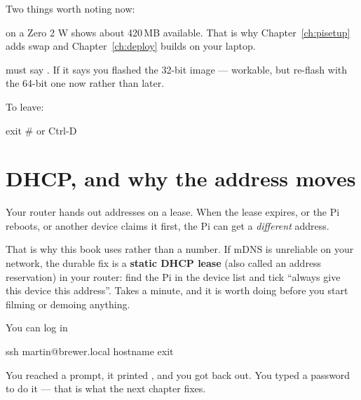 Two things worth noting now:

 on a Zero 2 W shows about 420\,MB available. That is why
Chapter~\ref{ch:pisetup} adds swap and Chapter~\ref{ch:deploy} builds on your
laptop.

 must say . If it says  you flashed the
32-bit image --- workable, but re-flash with the 64-bit one now rather than
later.

To leave:

\begin{shell}
exit          # or Ctrl-D
\end{shell}

\section{DHCP, and why the address moves}

Your router hands out addresses on a lease. When the lease expires, or the Pi
reboots, or another device claims it first, the Pi can get a \emph{different}
address.

That is why this book uses  rather than a number. If mDNS is
unreliable on your network, the durable fix is a \textbf{static DHCP lease} (also
called an address reservation) in your router: find the Pi in the device list and
tick ``always give this device this address''. Takes a minute, and it is worth
doing before you start filming or demoing anything.

\begin{checkpoint}{You can log in}
\begin{shell}
ssh martin@brewer.local
hostname
exit
\end{shell}

You reached a prompt, it printed , and you got back out. You typed a
password to do it --- that is what the next chapter fixes.
\end{checkpoint}
